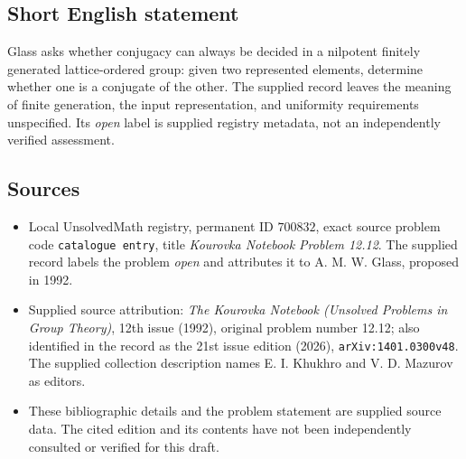 \documentclass[11pt]{article}
\begin{document}
\subsection{Short English statement}
Glass asks whether conjugacy can always be decided in a nilpotent finitely generated lattice-ordered group: given two represented elements, determine whether one is a conjugate of the other. The supplied record leaves the meaning of finite generation, the input representation, and uniformity requirements unspecified. Its \emph{open} label is supplied registry metadata, not an independently verified assessment.
\subsection{Sources}
\begin{itemize}
\item Local UnsolvedMath registry, permanent ID \(700832\), exact source problem code \texttt{catalogue entry}, title \emph{Kourovka Notebook Problem 12.12}. The supplied record labels the problem \emph{open} and attributes it to A. M. W. Glass, proposed in 1992.
\item Supplied source attribution: \emph{The Kourovka Notebook (Unsolved Problems in Group Theory)}, 12th issue (1992), original problem number 12.12; also identified in the record as the 21st issue edition (2026), \texttt{arXiv:1401.0300v48}. The supplied collection description names E. I. Khukhro and V. D. Mazurov as editors.
\item These bibliographic details and the problem statement are supplied source data. The cited edition and its contents have not been independently consulted or verified for this draft.
\end{itemize}
\end{document}
